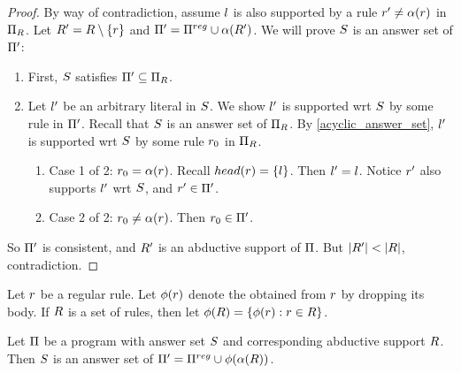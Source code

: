 \documentclass{paper}
\begin{document}
\begin{flushleft}
\begin{proof}

By way of contradiction, assume $l$ is also supported by
a rule ${r}' \ne \alpha(r)$ in $\Pi_{R}$.
Let ${R}' = R \setminus \{r\}$ and
${\Pi}' = \Pi^{reg} \cup \alpha({R}')$.
We will prove $S$ is an answer set of ${\Pi}'$:
\begin{enumerate}
\item
First, $S$ satisfies ${\Pi}' \subseteq \Pi_{R}$.
\item
Let ${l}'$ be an arbitrary literal in $S$. We show
${l}'$ is supported wrt $S$ by some rule in ${\Pi}'$.
Recall that $S$ is an answer set of $\Pi_{R}$.
By \ref{acyclic_answer_set}, ${l}'$ is supported wrt
$S$ by some rule ${r}_{0}$ in $\Pi_{R}$.
\begin{enumerate}
\item
Case 1 of 2: ${r}_{0} = \alpha(r)$.
Recall $head(r) = \{l\}$.
Then ${l}' = l$.
Notice ${r}'$ also supports ${l}'$ wrt $S$, and
${r}' \in {\Pi}'$.
\item
Case 2 of 2: ${r}_{0} \ne \alpha(r)$.
Then ${r}_{0} \in {\Pi}'$.
\end{enumerate}
\end{enumerate}
So ${\Pi}'$ is consistent, and ${R}'$ is an abductive
support of $\Pi$.
But $|{R}'| < |R|$, contradiction.

\end{proof}

\begin{definition}

Let $r$ be a regular rule.
Let $\phi(r)$ denote the 
obtained from $r$ by dropping its body.
If $R$ is a set of rules, then let
$\phi(R) = \{\phi(r) : r \in R\}$.

\end{definition}

\begin{lemma}
\label{factify_answer_set}

Let $\Pi$ be a \cp{} program with answer set $S$ and
corresponding abductive support $R$.
Then $S$ is an answer set of
${\Pi}' = \Pi^{reg} \cup \phi(\alpha(R))$.

\end{lemma}


\end{flushleft}
\end{document}
